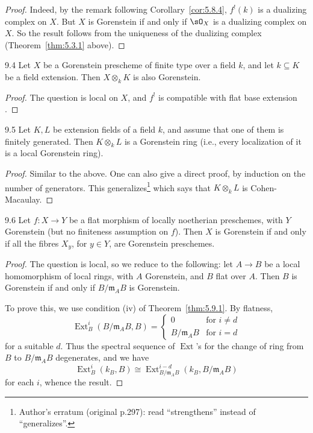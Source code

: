 \begin{proof}
Indeed, by the remark following Corollary~\ref{cor:5.8.4}, $f^{!}(k)$ is a dualizing complex on $X$. But $X$ is Gorenstein if and only if $\sO_X$ is a dualizing complex on $X$. So the result follows from the uniqueness of the dualizing complex (Theorem~\ref{thm:5.3.1} above).
\end{proof}

\begin{bookcorollary}{9.4}\label{cor:5.9.4}
Let $X$ be a Gorenstein prescheme of finite type over a field $k$, and let $k\subseteq K$ be a field extension. Then $X\otimes_k K$ is also Gorenstein.
\end{bookcorollary}

\begin{proof}
The question is local on $X$, and $f^{!}$ is compatible with flat base extension .
\end{proof}

\begin{bookcorollary}{9.5}\label{cor:5.9.5}
Let $K,L$ be extension fields of a field $k$, and assume that one of them is finitely generated. Then $K\otimes_k L$ is a Gorenstein ring (i.e., every localization of it is a local Gorenstein ring).
\end{bookcorollary}

\begin{proof}
Similar to the above. One can also give a direct proof, by induction on the number of generators. This generalizes\footnote{Author's erratum (original p.297): read ``strengthens'' instead of ``generalizes''.} \cite[\nopp IV,~6.7.1.1]{EGA} which says that $K\otimes_k L$ is Cohen-Macaulay.
\end{proof}

\begin{bookproposition}{9.6}\label{prop:5.9.6}
Let $f\colon X\to Y$ be a flat morphism of locally noetherian preschemes, with $Y$ Gorenstein (but no finiteness assumption on $f$). Then $X$ is Gorenstein if and only if all the fibres $X_{y}$, for $y\in Y$, are Gorenstein preschemes.
\end{bookproposition}

\begin{proof}
The question is local, so we reduce to the following: let $A\to B$ be a local homomorphism of local rings, with $A$ Gorenstein, and $B$ flat over $A$. Then $B$ is Gorenstein if and only if $B/\mathfrak{m}_A B$ is Gorenstein.

To prove this, we use condition (iv) of Theorem~\ref{thm:5.9.1}. By flatness,
\[
\operatorname{Ext}_{B}^{i}(B/\mathfrak{m}_A B, B) = \begin{cases} 0 & \text{for } i\neq d \\ B/\mathfrak{m}_A B & \text{for } i = d \end{cases}
\]
for a suitable $d$. Thus the spectral sequence of $\operatorname{Ext}$'s for the change of ring from $B$ to $B/\mathfrak{m}_A B$ degenerates, and we have
\[
\operatorname{Ext}_{B}^{i}(k_B, B) \cong \operatorname{Ext}_{B/\mathfrak{m}_A B}^{i-d}(k_B, B/\mathfrak{m}_A B)
\]
for each $i$, whence the result.
\end{proof}

